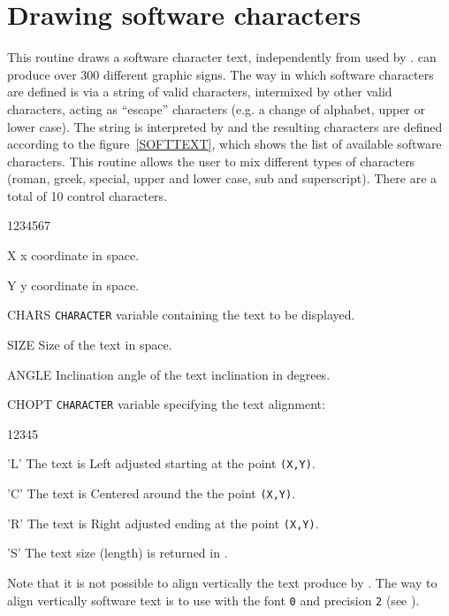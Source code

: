 \section{Drawing software characters}
\Action
This routine draws a software character text, independently from \UGP{} used by
\HIGZ.  can produce over 300 different graphic signs.
The way in which software characters are defined is via a string of valid
\FORTRAN{} characters, intermixed by other valid \FORTRAN{} characters, acting as
``escape'' characters  (e.g. a change of
alphabet, upper or lower case). The string is interpreted by  and
the resulting characters are defined according to the figure~\ref{SOFTTEXT},
which shows the list of available software characters. This routine allows the
user to mix different types of characters (roman, greek, special, upper and
lower case, sub and superscript). There are a total of 10 control characters.
\Pdesc
\begin{DLtt}{1234567}
\item[X] x coordinate in \WC space.
\item[Y] y coordinate in \WC space.
\item[CHARS] {\tt CHARACTER} variable containing the text
to be displayed.
\item[SIZE] Size of the text in \WC space.
\item[ANGLE] Inclination angle of the text inclination in degrees.
\item[CHOPT] {\tt CHARACTER} variable specifying the text alignment:
\begin{DLtt}{12345}
\item['L'] The text is Left adjusted starting at the point {\tt(X,Y)}.
\item['C'] The text is Centered around the the point {\tt(X,Y)}.
\item['R'] The text is Right adjusted ending at the point {\tt(X,Y)}.
\item['S'] The text size (length) is returned in .
\end{DLtt}
Note that it is not possible to align vertically the text produce by
. The way to align vertically software text is to use 
with the font {\tt 0} and precision {\tt 2} (see ).
\end{DLtt}
